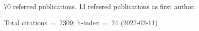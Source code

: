 70 refereed publications. 13 refeered publications as first author.

Total citations~=~2309; h-index~=~24 (2022-02-11)